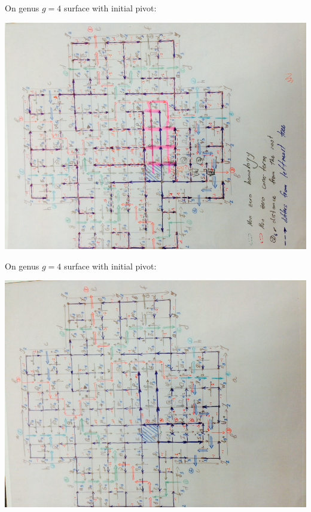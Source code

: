 \documentclass{article}
\begin{document}
On genus $g = 4$ surface with initial pivot:
\begin{center}
\includegraphics[angle = -90, scale = 0.7]{genus4_initialPivot.jpg}
\end{center}
\newpage

On genus $g = 4$ surface with initial pivot:
\begin{center}
\includegraphics[angle = -90, scale = 0.7]{genus4_after4Pivots.jpg}
\end{center}
\newpage
\end{document}
